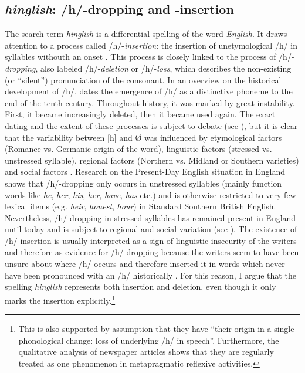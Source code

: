 \subsection{\emph{hinglish}: /h/-dropping and -insertion}
\label{bkm:Ref13036568}\hypertarget{Toc63021223}{}
The search term \emph{hinglish} is a differential spelling of the word \emph{English}. It draws attention to a process called /h/-\textit{insertion}: the insertion of unetymological /h/ in syllables withouth an onset \citep[65]{Lass2006}. This process is closely linked to the process of /h/-\textit{dropping}, also labeled /h/-\textit{deletion} or /h/-\textit{loss}, which describes the non-existing (or “silent”) pronunciation of the consonant. In an overview on the historical development of /h/, \citet[104--108]{Minkova2014} dates the emergence of /h/ as a distinctive phoneme to the end of the tenth century. Throughout history, it was marked by great instability. First, it became increasingly deleted, then it became used again. The exact dating and the extent of these processes is subject to debate (see \citealt{Milroy1983,Lass2006,Crisma2007,Schluter2009,Schluter2012}), but it is clear that the variability between [h] and Ø was influenced by etymological factors (Romance vs. Germanic origin of the word), linguistic factors (stressed vs. unstressed syllable), regional factors (Northern vs. Midland or Southern varieties) and social factors \citep[105--108]{Minkova2014}. Research on the Present-Day English situation in England shows that /h/-dropping only occurs in unstressed syllables (mainly function words like \emph{he}, \emph{her}, \emph{his}, \emph{her}, \emph{have}, \emph{has} etc.) and is otherwise restricted to very few lexical items (e.g. \emph{heir}, \emph{honest}, \emph{hour}) in Standard Southern British English. Nevertheless, /h/-dropping in stressed syllables has remained present in England until today and is subject to regional and social variation (see \citealt{Ramisch2010}). The existence of /h/-insertion is usually interpreted as a sign of linguistic insecurity of the writers and therefore as evidence for /h/-dropping because the writers seem to have been unsure about where /h/ occurs and therefore inserted it in words which never have been pronounced with an /h/ historically \citep{Milroy1983}. For this reason, I argue that the spelling \emph{hinglish} represents both insertion and deletion, even though it only marks the insertion explicitly.\footnote{This is also supported by  assumption that they have “their origin in a single phonological change: loss of underlying /h/ in speech”. Furthermore, the qualitative analysis of newspaper articles shows that they are regularly treated as one phenomenon in metapragmatic reflexive activities.}


